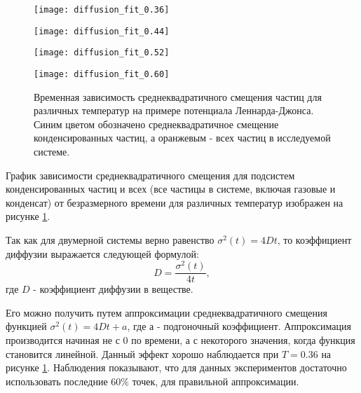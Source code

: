 \begin{figure}[h]
\begin{center}
\begin{minipage}[h]{0.45\linewidth}
\texttt{[image: diffusion\_fit\_0.36]}
\end{minipage}
\begin{minipage}[h]{0.45\linewidth}
\texttt{[image: diffusion\_fit\_0.44]}
\end{minipage}


\begin{minipage}[h]{0.45\linewidth}
\texttt{[image: diffusion\_fit\_0.52]}
\end{minipage}
\begin{minipage}[h]{0.45\linewidth}
\texttt{[image: diffusion\_fit\_0.60]}
\end{minipage}
\caption{Временная зависимость среднеквадратичного смещения частиц для различных температур на примере потенциала Леннарда-Джонса. Синим цветом обозначено среднеквадратичное смещение конденсированных частиц,  а оранжевым - всех частиц в исследуемой системе.}
\label{risRMS}
\end{center}
\end{figure}

График зависимости среднеквадратичного смещения для подсистем конденсированных частиц и всех (все частицы в системе, включая газовые и конденсат) от безразмерного времени для различных температур изображен на рисунке \ref{risRMS}.

Так как для двумерной системы верно равенство $\sigma^2(t) = 4Dt$, то коэффициент диффузии выражается следующей формулой:
\begin{equation}
    D = \frac{\sigma^2(t)}{4t},
    \label{eqD}
\end{equation}
где $D$ - коэффициент диффузии в веществе.

Его можно получить путем аппроксимации среднеквадратичного смещения функцией $\sigma^2(t) = 4Dt + a$, где $а$ - подгоночный коэффициент. Аппроксимация производится начиная не с 0 по времени, а с некоторого значения, когда функция становится линейной. Данный эффект хорошо наблюдается при $T = 0.36$ на рисунке \ref{risRMS}. Наблюдения показывают, что для данных экспериментов достаточно использовать последние $60\%$ точек, для правильной аппроксимации.  

